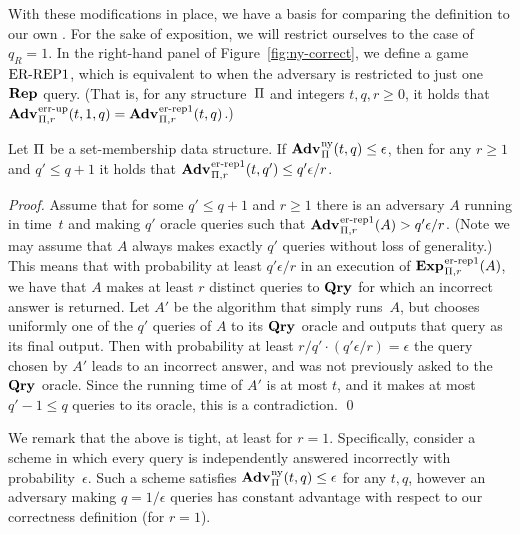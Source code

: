 With these modifications in place, we have a basis for
comparing the \ny definition to our own \errep. For the sake of exposition, we
will restrict ourselves to the case of~$q_R=1$. In the right-hand panel of
Figure~\ref{fig:ny-correct}, we define a game $\textnormal{ER\mbox{-}REP1}$, which is equivalent
to \errep when the adversary is restricted to just one~$\mathbf{Rep}\hspace{0.5pt}$ query. (That is,
for any structure~$\mathrm{\Pi}$ and integers $t,q,r\geq0$, it holds that
$\Adv{\errep}_{\struct,r}(t,1,q) = \Adv{\errepone}_{\struct,r}(t,q)$.)
%
%
\begin{theorem}
  Let $\mathrm{\Pi}$ be a set-membership data structure.
  If $\Adv{\ny}_{\struct}(t,q) \leq \epsilon$, then for any $r \geq 1$
  and $q' \leq q+1$ it holds that $\Adv{\errepone}_{\struct,r}(t,q') \leq
  q'\epsilon/r$.
\end{theorem}
\begin{proof}
  Assume that for some $q' \leq q+1$ and $r \geq 1$ there is an adversary $A$
  running in time~$t$ and making $q'$ oracle queries such that
  $\Adv{\errepone}_{\struct,r}(A) > q'\epsilon/r$.
  (Note we may assume that $A$ always makes exactly $q'$ queries without loss of
  generality.)
  This means that with probability at least $q'\epsilon/r$ in an execution of
  $\Exp{\errepone}_{\struct,r}(A)$, we have that $A$ makes at least $r$ distinct queries
  to $\mathbf{Qry}\hspace{0.5pt}$ for which an incorrect answer is returned.
  Let $A'$ be the algorithm that simply runs~$A$, but chooses uniformly one of
  the $q'$ queries of $A$ to its $\mathbf{Qry}\hspace{0.5pt}$ oracle and outputs that query as
  its final output.
  Then with probability at least $r/q' \cdot (q'\epsilon/r)=\epsilon$ the query
  chosen by $A'$ leads to an incorrect answer, and was not previously asked to
  the $\mathbf{Qry}\hspace{0.5pt}$ oracle.  Since the running time of $A'$ is at most $t$, and
  it makes at most $q'-1 \leq q$ queries to its oracle, this is a contradiction.
  \hfill\qed
\end{proof}

We remark that the above is tight, at least for $r=1$. Specifically, consider a
scheme in which every query is independently answered incorrectly with
probability~$\epsilon$. Such a scheme satisfies $\Adv{\ny}_{\struct}(t,q)
\leq \epsilon$ for any $t, q$, however an adversary making $q=1/\epsilon$
queries has constant advantage with respect to our correctness definition (for
$r=1$).


